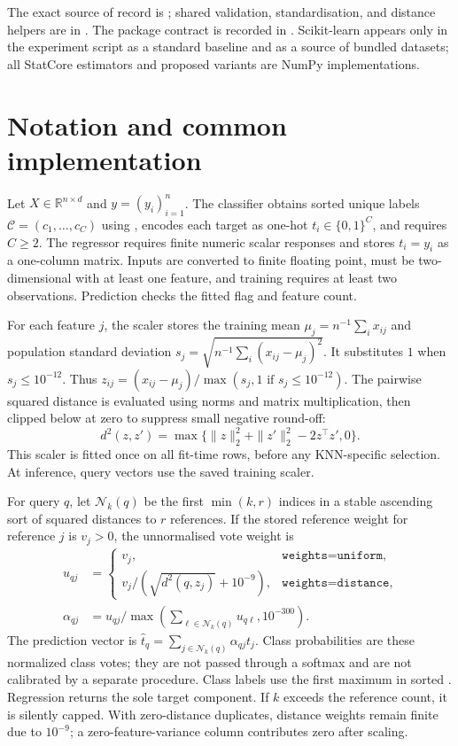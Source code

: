 \documentclass[conference]{IEEEtran}
\begin{document}
The exact source of record is ; shared validation, standardisation, and distance helpers are in . The package contract is recorded in . Scikit-learn appears only in the experiment script as a standard baseline and as a source of bundled datasets; all StatCore estimators and proposed variants are NumPy implementations.

\section{Notation and common implementation}
Let $X\in\mathbb{R}^{n\times d}$ and $y=(y_i)_{i=1}^n$. The classifier obtains sorted unique labels $\mathcal C=(c_1,\ldots,c_C)$ using , encodes each target as one-hot $t_i\in\{0,1\}^C$, and requires $C\geq2$. The regressor requires finite numeric scalar responses and stores $t_i=y_i$ as a one-column matrix. Inputs are converted to finite floating point, must be two-dimensional with at least one feature, and training requires at least two observations. Prediction checks the fitted flag and feature count.

For each feature $j$, the scaler stores the training mean $\mu_j=n^{-1}\sum_i x_{ij}$ and population standard deviation $s_j=\sqrt{n^{-1}\sum_i(x_{ij}-\mu_j)^2}$. It substitutes $1$ when $s_j\leq10^{-12}$. Thus $z_{ij}=(x_{ij}-\mu_j)/\max(s_j,1\text{ if }s_j\leq10^{-12})$. The pairwise squared distance is evaluated using norms and matrix multiplication, then clipped below at zero to suppress small negative round-off:
\begin{equation}
 d^2(z,z')=\max\{\|z\|_2^2+\|z'\|_2^2-2z^\top z',0\}.
 \label{eq:dist}
\end{equation}
This scaler is fitted once on all fit-time rows, before any KNN-specific selection. At inference, query vectors use the saved training scaler.

For query $q$, let $\mathcal N_k(q)$ be the first $\min(k,r)$ indices in a stable ascending sort of squared distances to $r$ references. If the stored reference weight for reference $j$ is $v_j>0$, the unnormalised vote weight is
\begin{align}
 u_{qj}&=\begin{cases}
 v_j,&\texttt{weights=uniform},\\
 v_j/(\sqrt{d^2(q,z_j)}+10^{-9}),&\texttt{weights=distance},
 \end{cases}\\
 \alpha_{qj}&=u_{qj}/\max\!\left(\sum_{\ell\in\mathcal N_k(q)}u_{q\ell},10^{-300}\right).
 \label{eq:vote}
\end{align}
The prediction vector is $\hat t_q=\sum_{j\in\mathcal N_k(q)}\alpha_{qj}t_j$. Class probabilities are these normalized class votes; they are not passed through a softmax and are not calibrated by a separate procedure. Class labels use the first maximum in sorted . Regression returns the sole target component. If $k$ exceeds the reference count, it is silently capped. With zero-distance duplicates, distance weights remain finite due to $10^{-9}$; a zero-feature-variance column contributes zero after scaling.
\end{document}

